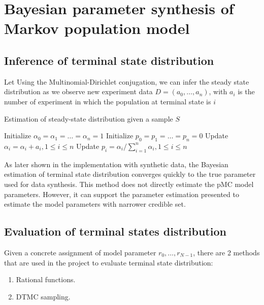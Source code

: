 \documentclass[12pt]{article}
\theoremstyle{definition}
\begin{document}
\section{Bayesian parameter synthesis of Markov population model}
\subsection{Inference of terminal state distribution}
Let
Using the Multinomial-Dirichlet conjugation, we can infer  the steady state
distribution as we observe new experiment data $D=(a_0,\ldots,a_n)$, with $a_i$
is the number of experiment in which the population at terminal state is $i$ 
\begin{algorithm}[H]
  \caption{Estimation of steady-state distribution given a sample $S$}\label{exp_a}
  \begin{algorithmic}[1]
    \State Initialize $\alpha_0=\alpha_1=\ldots=\alpha_n=1$
    \State Initialize $p_0=p_1=\ldots=p_n=0$
    \State Update $\alpha_i = \alpha_i + a_i, 1 \leq i \leq n$
    \State Update $p_i = \alpha_i / \sum_{i=1}^n \alpha_i, 1 \leq i \leq n$
    \EndProcedure
  \end{algorithmic}
\end{algorithm}

As later shown in the implementation with synthetic data, the Bayesian
estimation of terminal state distribution converges quickly to the true parameter
used for data synthesis. This method does not directly estimate the pMC
model parameters. However, it can support the parameter estimation presented
\cite{hajnal2019data} to estimate the model parameters with narrower credible
set.


\subsection{Evaluation of terminal states distribution}
Given a concrete assignment of model parameter $r_0,\ldots,r_{N-1}$, there are 2
methods that are used in the project to evaluate terminal state distribution:
\begin{enumerate}
\item Rational functions.
\item DTMC sampling.
\end{enumerate}
\end{document}
